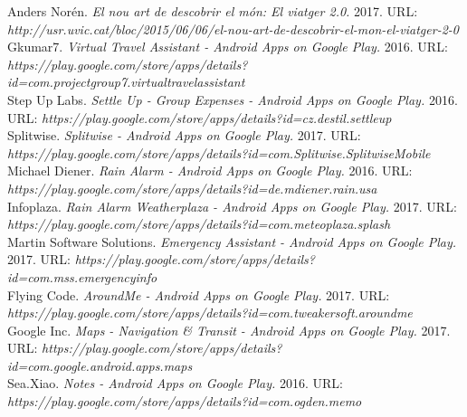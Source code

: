 \documentclass[
11pt, %
english,
spanish,
catalan,
singlespacing, %
headsepline %
]{MastersDoctoralThesis} %
\begin{document}
\begin{thebibliography}

   Anders Norén. {\em El nou art de descobrir el món: El viatger 2.0.}  2017. URL: {\em http://usr.uvic.cat/bloc/2015/06/06/el-nou-art-de-descobrir-el-mon-el-viatger-2-0}\\

   Gkumar7. {\em Virtual Travel Assistant - Android Apps on Google Play.}  2016. URL: {\em https://play.google.com/store/apps/details?id=com.projectgroup7.virtualtravelassistant}\\

   Step Up Labs. {\em Settle Up - Group Expenses - Android Apps on Google Play.}  2016. URL: {\em https://play.google.com/store/apps/details?id=cz.destil.settleup}\\

   Splitwise. {\em Splitwise - Android Apps on Google Play.}  2017. URL: {\em https://play.google.com/store/apps/details?id=com.Splitwise.SplitwiseMobile}\\
    
   Michael Diener. {\em Rain Alarm - Android Apps on Google Play.}  2016. URL: {\em https://play.google.com/store/apps/details?id=de.mdiener.rain.usa}\\
  
   Infoplaza. {\em Rain Alarm Weatherplaza - Android Apps on Google Play.}  2017. URL: {\em https://play.google.com/store/apps/details?id=com.meteoplaza.splash}\\
    
   Martin Software Solutions. {\em Emergency Assistant - Android Apps on Google Play.}  2017. URL: {\em https://play.google.com/store/apps/details?id=com.mss.emergencyinfo}\\
     
   Flying Code. {\em AroundMe - Android Apps on Google Play.}  2017. URL: {\em https://play.google.com/store/apps/details?id=com.tweakersoft.aroundme}\\
       
   Google Inc. {\em Maps - Navigation & Transit - Android Apps on Google Play.}  2017. URL: {\em https://play.google.com/store/apps/details?id=com.google.android.apps.maps}\\
         
   Sea.Xiao. {\em Notes - Android Apps on Google Play.}  2016. URL: {\em https://play.google.com/store/apps/details?id=com.ogden.memo}\\
    

\end{thebibliography}
\end{document}
